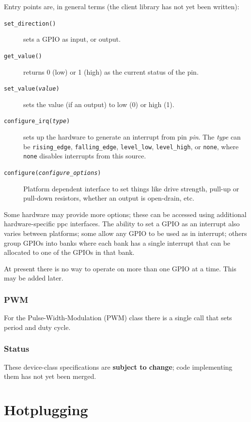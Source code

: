 \documentclass[a4paper,12pt]{report}
\begin{document}
Entry points are, in general terms (the client library has not yet
been written):
\begin{description}
\item[\texttt{set\_direction()}]
  sets a GPIO as input, or output.
\item[\texttt{get\_value()}] returns 0 (low) or 1 (high) as
  the current status of the pin.
\item[\texttt{set\_value(\emph{value})}] sets the value
  (if an output) to low (0) or high (1).
\item[\texttt{configure\_irq(\emph{type})}] sets up the
  hardware to generate an interrupt from pin \emph{pin}.  The
  \emph{type} can be \texttt{rising\_edge}, \texttt{falling\_edge},
  \texttt{level\_low}, \texttt{level\_high}, or \texttt{none}, where
  \texttt{none} disables interrupts from this source.
\item[\texttt{configure(\emph{configure\_options})}] Platform
  dependent interface to set things like drive strength, pull-up or
  pull-down resistors, whether an output is open-drain, etc.
\end{description}

Some hardware may provide more options; these can be accessed
using additional hardware-specific \gls{ppc} interfaces.  The
ability to set a GPIO as an interrupt also varies between platforms;
some allow any GPIO to be used as in interrupt; others group GPIOs
into banks where each bank has a single interrupt that can be
allocated to one of the GPIOs in that bank.

At present there is no way to operate on more than one GPIO at a time.
This may be added later.

\subsection{PWM}\label{s:pwm}
For the Pulse-Width-Modulation (PWM) class there is
a single call that sets period and duty cycle.


\subsection{Status}

These device-class specifications are \textbf{subject to change}; code
implementing them has not yet been merged.

\chapter{Hotplugging}\label{s:hotplugging}
\end{document}
